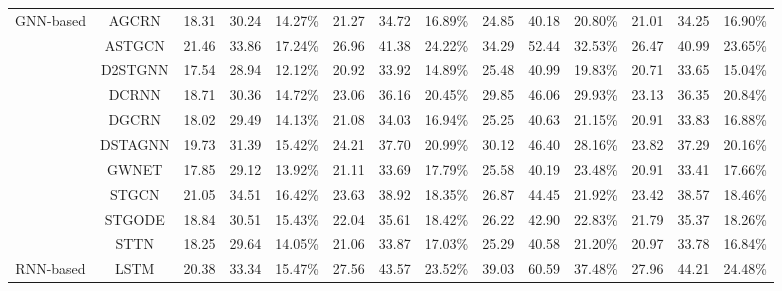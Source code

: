 \documentclass[10pt]{article}
\begin{document}
\begin{table}[t]
{\begin{tabular}{c|c|c|c|c|c|c|c|c|c|c|c|c|c}
\midrule
\multirow{10}{*}{GNN-based} & AGCRN & 18.31 & 30.24 & 14.27\% & 21.27 & 34.72 & 16.89\% & 24.85 & 40.18 & 20.80\% & 21.01 & 34.25 & 16.90\% \\
& ASTGCN & 21.46 & 33.86 & 17.24\% & 26.96 & 41.38 & 24.22\% & 34.29 & 52.44 & 32.53\% & 26.47 & 40.99 & 23.65\% \\
& D2STGNN & 17.54 & 28.94 & 12.12\% & 20.92 & 33.92 & 14.89\% & 25.48 & 40.99 & 19.83\% & 20.71 & 33.65 & 15.04\% \\
& DCRNN & 18.71 & 30.36 & 14.72\% & 23.06 & 36.16 & 20.45\% & 29.85 & 46.06 & 29.93\% & 23.13 & 36.35 & 20.84\% \\
& DGCRN & 18.02 & 29.49 & 14.13\% & 21.08 & 34.03 & 16.94\% & 25.25 & 40.63 & 21.15\% & 20.91 & 33.83 & 16.88\% \\
& DSTAGNN & 19.73 & 31.39 & 15.42\% & 24.21 & 37.70 & 20.99\% & 30.12 & 46.40 & 28.16\% & 23.82 & 37.29 & 20.16\% \\
& GWNET & 17.85 & 29.12 & 13.92\% & 21.11 & 33.69 & 17.79\% & 25.58 & 40.19 & 23.48\% & 20.91 & 33.41 & 17.66\% \\
& STGCN & 21.05 & 34.51 & 16.42\% & 23.63 & 38.92 & 18.35\% & 26.87 & 44.45 & 21.92\% & 23.42 & 38.57 & 18.46\% \\
& STGODE & 18.84 & 30.51 & 15.43\% & 22.04 & 35.61 & 18.42\% & 26.22 & 42.90 & 22.83\% & 21.79 & 35.37 & 18.26\% \\
& STTN & 18.25 & 29.64 & 14.05\% & 21.06 & 33.87 & 17.03\% & 25.29 & 40.58 & 21.20\% & 20.97 & 33.78 & 16.84\% \\

\midrule
\multirow{1}{*}{RNN-based} & LSTM & 20.38 & 33.34 & 15.47\% & 27.56 & 43.57 & 23.52\% & 39.03 & 60.59 & 37.48\% & 27.96 & 44.21 & 24.48\% \\


\end{tabular}}
\end{table}
\end{document}
